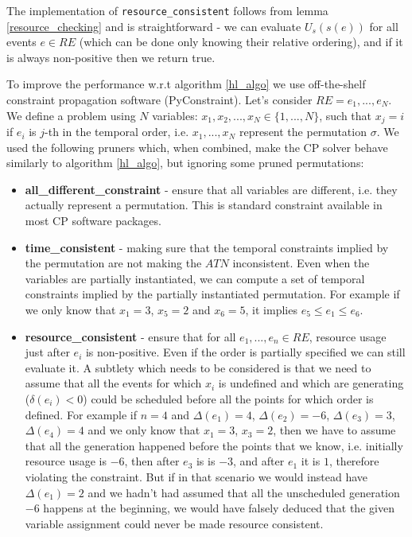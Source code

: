 \vspace{-3mm}

The implementation of \texttt{resource\_consistent} follows from lemma \ref{resource_checking} and is straightforward - we can evaluate $U_s(s(e))$ for all events $e \in RE$ (which can be done only knowing their relative ordering), and if it is always non-positive then we return true.

To improve the performance w.r.t algorithm \ref{hl_algo} we use off-the-shelf constraint propagation software (PyConstraint). Let's consider $RE={e_1, ..., e_N}$. We define a problem using $N$ variables:  $x_1, x_2, ..., x_N \in \{ 1, ..., N \}$, such that $x_j=i$ if $e_i$ is $j$-th in the temporal order, i.e. $x_1, ..., x_N$ represent the permutation $\sigma$. We used the following pruners which, when combined, make the CP solver behave similarly to algorithm \ref{hl_algo}, but ignoring some pruned permutations:
\begin{itemize}
\setlength\itemsep{0.2em}
\item \textbf{all\_different\_constraint} - ensure that all variables are different, i.e. they actually represent a permutation. This is standard constraint available in most CP software packages.
\item \textbf{time\_consistent} - making sure that the temporal constraints implied by the permutation are not making the $ATN$ inconsistent. Even when the variables are partially instantiated, we can compute a set of temporal constraints implied by the partially instantiated permutation. For example if we only know that $x_1 = 3$, $x_5 = 2$ and $x_6=5$, it implies $e_5 \leq e_1 \leq e_6$.
\item \textbf{resource\_consistent} - ensure that for all $e_1, ..., e_n \in RE$, resource usage just after $e_i$ is non-positive. Even if the order is partially specified we can still evaluate it. A subtlety which needs to be considered is that we need to assume that all the events for which $x_i$ is undefined and which are generating ($\delta(e_i) < 0$) could be scheduled before all the points for which order is defined. For example if $n = 4$ and $\Delta(e_1) = 4$, $\Delta(e_2) = -6$, $\Delta(e_3) = 3$, $\Delta(e_4) = 4$ and we only know that $x_1 = 3$, $x_3 = 2$, then we have to assume that all the generation happened before the points that we know, i.e. initially resource usage is $-6$, then after $e_3$ is is $-3$, and after $e_1$ it is $1$, therefore violating the constraint. But if in that scenario we would instead have $\Delta(e_1) = 2$ and we hadn't had assumed that all the unscheduled generation $-6$ happens at the beginning, we would have falsely deduced that the given variable assignment could never be made resource consistent.
\end{itemize}

